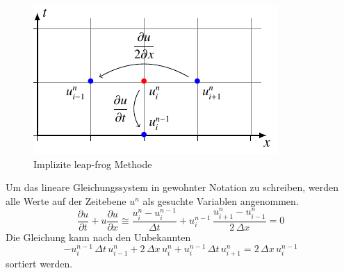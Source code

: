 	    \begin{figure}
		\centering
		\includegraphics[height=.4\textwidth]{papers/burgers/BurgersEquation/tikz/implicit/implicit.pdf}
		\caption{Implizite leap-frog Methode}
		\label{burgers:fig:Implicit}
	\end{figure}
	Um das lineare Gleichungssystem in gewohnter Notation zu schreiben, werden alle Werte auf der Zeitebene $u^n$ als gesuchte Variablen angenommen.
	\begin{equation}
	\frac {\partial u}{\partial t}+u{\frac {\partial u}{\partial x}} \cong \frac{u_{i}^{n}-u_{i}^{n-1}}{\Delta t}+ u_{i}^{n-1}\, \frac{u_{i+1}^{n}-u_{i-1}^{n}}{2\,\Delta x}=0
	\end{equation}
	Die Gleichung kann nach den Unbekannten
	\begin{equation}
	   -u_{i}^{n-1} \, \Delta t \, u_{i-1}^{n} +  2 \, \Delta x \,  u_{i}^{n} + u_{i}^{n-1} \, \Delta t \, u_{i+1}^{n} =  2 \, \Delta x \, u_{i}^{n-1}
	\end{equation}
	sortiert werden.


